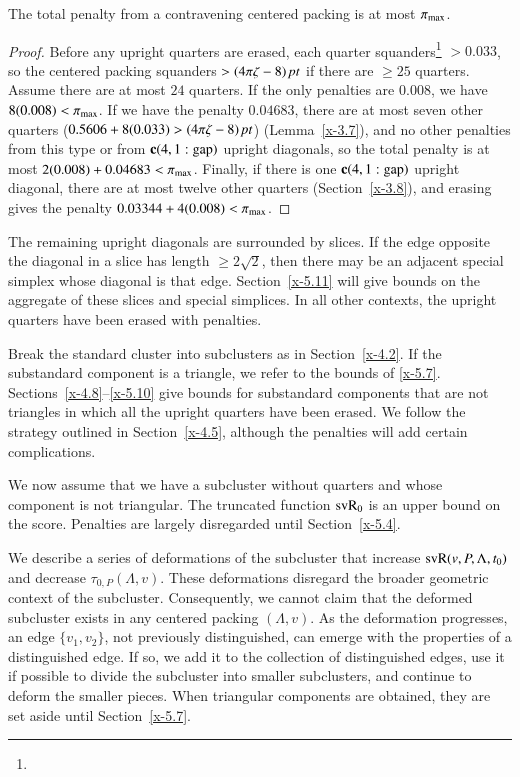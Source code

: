 \begin{lemma}
The total penalty from a contravening centered packing is at most
$\pi_{\max}$.
\end{lemma}

\begin{proof}
Before any upright quarters are erased, each quarter
squanders\footnote{} %
$>0.033$, so the centered packing squanders $>(4\pi\zeta-8)\,\hbox{\it pt}$ if there
are $\ge25$ quarters.  Assume there are at most $24$ quarters. If
the only penalties are $0.008$, we have $8(0.008)<\pi_{\max}$. If we
have the penalty $0.04683$, there are at most seven other quarters
($0.5606+8(0.033)>(4\pi\zeta-8)\,\hbox{\it pt}$) (Lemma~\ref{x-3.7}), and no other
penalties from this type or from ${\operatorname{\bf c}}{(4,1:{\operatorname{gap}})}$ upright diagonals, so
the total penalty is at most $2(0.008)+ 0.04683 < \pi_{\max}$.
Finally, if there is one ${\operatorname{\bf c}}{(4,1:{\operatorname{gap}})}$ upright diagonal, there are
at most twelve other quarters (Section~\ref{x-3.8}), and erasing
gives the penalty $0.03344+4 (0.008)<\pi_{\max}$.
\end{proof}

The remaining upright diagonals are surrounded by slices. If
the edge opposite the diagonal in a slice has length
$\ge2\sqrt2$, then there may be an adjacent special simplex whose
diagonal is that edge.  Section~\ref{x-5.11} will give bounds on the
aggregate of these slices and special simplices.  In all
other contexts, the upright quarters have been erased with penalties.

Break the standard cluster into subclusters as in Section~\ref{x-4.2}.
If the substandard component is a triangle, we refer to the bounds of \ref{x-5.7}.
Sections~\ref{x-4.8}--\ref{x-5.10} give bounds for substandard components that are
not triangles in which all the upright quarters have been erased. We
follow the strategy outlined in Section~\ref{x-4.5}, although the
penalties will add certain complications.

We now assume that we have a subcluster without quarters and whose
component is not triangular.  The truncated function ${\operatorname{svR}}_0$ is an
upper bound on the score.  Penalties are largely disregarded until
Section~\ref{x-5.4}.

We describe a series of deformations of the subcluster that
increase ${\operatorname{svR}}(v,P,\Lambda,t_0)$ and decrease $\tau_{0,P}(\Lambda,v)$.  These
deformations disregard the broader geometric context of the
subcluster. Consequently, we cannot claim that the deformed
subcluster exists in any centered packing $(\Lambda,v)$.  As the deformation
progresses, an edge $\{v_1,v_2\}$, not previously distinguished,
can emerge with the properties of a distinguished edge. If so, we
add it to the collection of distinguished edges, use it if
possible to divide the subcluster into smaller subclusters, and
continue to deform the smaller pieces.  When triangular components
are obtained, they are set aside until Section~\ref{x-5.7}.


